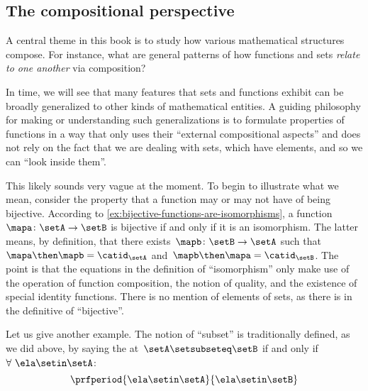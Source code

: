 \subsection{The compositional perspective}

A central theme in this book is to study how various mathematical structures compose.
For instance, what are general patterns of how functions and sets \emph{relate to one another} via composition?

In time, we will see that many features that sets and functions exhibit can be broadly generalized to other kinds of mathematical entities.
A guiding philosophy for making or understanding such generalizations is to formulate properties of functions in a way that only uses their ``external compositional aspects'' and does not rely on the fact that we are dealing with sets, which have elements, and so we can ``look inside them''.

This likely sounds very vague at the moment.
To begin to illustrate what we mean, consider the property that a function may or may not have of being bijective.
According to \cref{ex:bijective-functions-are-isomorphisms}, a function~$\mapa\colon \setA \to \setB$ is bijective if and only if it is an isomorphism.
The latter means, by definition, that there exists~$\mapb \colon \setB \to \setA$ such that~$\mapa \then \mapb = \catid_\setA$ and~$\mapb \then \mapa = \catid_\setB$.
The point is that the equations in the definition of ``isomorphism'' only make use of the operation of function composition, the notion of quality, and the existence of special identity functions.
There is no mention of elements of sets, as there is in the definitive of ``bijective''.

Let us give another example.
The notion of ``subset'' is traditionally defined, as we did above, by saying the at~$\setA \setsubseteq \setB$ if and only if~$\forall \ \ela \setin\setA$:
\begin{equation*}
    \prfperiod{
        \ela \setin\setA
    }{
        \ela \setin\setB
    }
\end{equation*}


